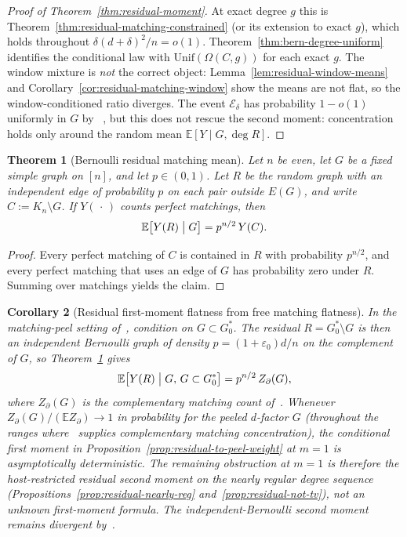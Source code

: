 \documentclass[11pt]{article}
\newtheorem{theorem}{Theorem}
\newtheorem{corollary}[theorem]{Corollary}
\newcommand{\EE}{\mathbb{E}}
\begin{document}
\begin{proof}[Proof of Theorem~\ref{thm:residual-moment}]
At exact degree \(g\) this is Theorem~\ref{thm:residual-matching-constrained} (or its
extension to exact \(g\)), which holds throughout \(\delta(d+\delta)^2/n=o(1)\).
Theorem~\ref{thm:bern-degree-uniform} identifies the conditional law with
\(\mathrm{Unif}(\Omega(C,g))\) for each exact \(g\). The window mixture is \emph{not} the
correct object: Lemma~\ref{lem:residual-window-means} and
Corollary~\ref{cor:residual-matching-window} show the means are not flat, so the
window-conditioned ratio diverges. The event \(\mathcal E_\delta\)
has probability \(1-o(1)\) uniformly in \(G\) by
~\cite[Lemma~residual-sharp]{PlusOneV1}, but this does not rescue the second moment:
concentration holds only around the random mean \(\EE[Y\mid G,\deg R]\).
\end{proof}

\begin{theorem}[Bernoulli residual matching mean]
\label{thm:residual-matching-mean}
Let \(n\) be even, let \(G\) be a fixed simple graph on \([n]\), and let
\(p\in(0,1)\). Let \(R\) be the random graph with an independent edge of
probability \(p\) on each pair outside \(E(G)\), and write
\(C:=K_n\setminus G\). If \(Y(\,\cdot\,)\) counts perfect matchings, then
\[
\EE\bigl[Y(R)\bigm|G\bigr]
=
p^{n/2}\,Y(C).
\]
\end{theorem}

\begin{proof}
Every perfect matching of \(C\) is contained in \(R\) with probability
\(p^{n/2}\), and every perfect matching that uses an edge of \(G\) has
probability zero under \(R\). Summing over matchings yields the claim.
\end{proof}

\begin{corollary}[Residual first-moment flatness from free matching flatness]
\label{cor:residual-first-moment}
In the matching-peel setting of~\cite{PlusOneV1}, condition on
\(G\subset G^*_0\). The residual \(R=G^*_0\setminus G\) is then an independent
Bernoulli graph of density \(p=(1+\varepsilon_0)d/n\) on the complement of \(G\), so
Theorem~\ref{thm:residual-matching-mean} gives
\[
\EE\bigl[Y(R)\bigm|G,\,G\subset G^*_0\bigr]
=
p^{n/2}\,Z_\partial(G),
\]
where \(Z_\partial(G)\) is the complementary matching count of~\cite{PlusOneV1}.
Whenever \(Z_\partial(G)/(\EE Z_\partial)\to1\) in probability for the peeled
\(d\)-factor \(G\) (throughout the ranges where~\cite{PlusOneV1} supplies
complementary matching concentration), the conditional first moment in
Proposition~\ref{prop:residual-to-peel-weight} at \(m=1\) is asymptotically
deterministic. The remaining obstruction at \(m=1\) is therefore the
host-restricted residual second moment on the nearly regular degree sequence
(Propositions~\ref{prop:residual-nearly-reg} and~\ref{prop:residual-not-tv}),
not an unknown first-moment formula. The independent-Bernoulli second moment
remains divergent by~\cite[Proposition~bernoulli-moment]{PlusOneV1}.
\end{corollary}
\end{document}
